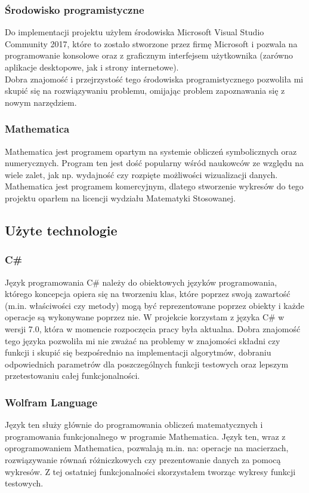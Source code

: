 \documentclass[twoside]{projektInzynierskiMS1}
\newcommand{\si}{ś}
\begin{document}
	\subsubsection{Środowisko programistyczne}
Do implementacji projektu użyłem \si rodowiska Microsoft Visual Studio Community 2017, które to zostało stworzone przez firmę Microsoft i pozwala na programowanie konsolowe oraz z graficznym interfejsem użytkownika (zarówno aplikacje desktopowe, jak i strony internetowe).  \\
Dobra znajomo\si ć i przejrzysto\si ć tego \si rodowiska programistycznego pozwoliła mi skupić się na rozwiązywaniu problemu, omijając problem zapoznawania się z nowym narzędziem.
	\subsubsection{Mathematica}
	Mathematica jest programem opartym na systemie obliczeń symbolicznych oraz numerycznych. Program ten jest do\si ć popularny w\si ród naukowców ze względu na wiele zalet, jak np. wydajno\si ć czy rozpięte możliwo\si ci wizualizacji danych. Mathematica jest programem komercyjnym, dlatego stworzenie wykresów do tego projektu oparłem na licencji wydziału Matematyki Stosowanej.
	
	\subsection{Użyte technologie}
	\subsubsection{C\#}
Język programowania C\# należy do obiektowych języków programowania, którego koncepcja opiera się na tworzeniu klas, które poprzez swoją zawarto\si ć (m.in. wła\si ciwo\si ci czy metody) mogą być reprezentowane poprzez obiekty i każde operacje są wykonywane poprzez nie. W projekcie korzystam z języka C\# w wersji 7.0, która w momencie rozpoczęcia pracy była aktualna. Dobra znajomo\si ć tego języka pozwoliła mi nie zważać na problemy w znajomo\si ci składni czy funkcji i skupić się bezpo\si rednio na implementacji algorytmów, dobraniu odpowiednich parametrów dla poszczególnych funkcji testowych oraz lepszym przetestowaniu całej funkcjonalno\si ci.

\subsubsection{Wolfram Language}
Język ten służy głównie do programowania obliczeń matematycznych i programowania funkcjonalnego w programie Mathematica. Język ten, wraz z oprogramowaniem Mathematica, pozwalają m.in. na: operacje na macierzach, rozwiązywanie równań różniczkowych czy prezentowanie danych za pomocą wykresów. Z tej ostatniej funkcjonalno\si ci skorzystałem tworząc wykresy funkcji testowych.
\end{document}
